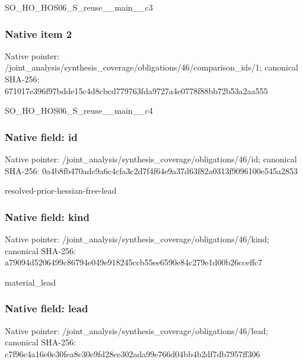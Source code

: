 \documentclass[10pt,a4paper]{article}
\begin{document}
\begingroup\raggedright\sloppy SO\_\allowbreak{}HO\_\allowbreak{}HOS06\_\allowbreak{}S\_\allowbreak{}reuse\_\allowbreak{}\_\allowbreak{}main\_\allowbreak{}\_\allowbreak{}c3\par\endgroup

\subsubsection{Native item 2}
Native pointer: /joint\_\allowbreak{}analysis/synthesis\_\allowbreak{}coverage/obligations/46/comparison\_\allowbreak{}ids/1; canonical SHA-256: 671017e396f97bdde15c4d8cbcd779763fda9727a4e0778f88bb72b53a2aa555

\begingroup\raggedright\sloppy SO\_\allowbreak{}HO\_\allowbreak{}HOS06\_\allowbreak{}S\_\allowbreak{}reuse\_\allowbreak{}\_\allowbreak{}main\_\allowbreak{}\_\allowbreak{}c4\par\endgroup

\subsubsection{Native field: id}
Native pointer: /joint\_\allowbreak{}analysis/synthesis\_\allowbreak{}coverage/obligations/46/id; canonical SHA-256: 0a4b8fb470adc9a6c4cfa3c2d7f4f64e9a37d63f82a0313f9096100e545a2853

\begingroup\raggedright\sloppy resolved-prior-hessian-free-lead\par\endgroup

\subsubsection{Native field: kind}
Native pointer: /joint\_\allowbreak{}analysis/synthesis\_\allowbreak{}coverage/obligations/46/kind; canonical SHA-256: a79094d5206499c86794e049e918245ccb55ee6590e84c279e1d00b26cceffc7

\begingroup\raggedright\sloppy material\_\allowbreak{}lead\par\endgroup

\subsubsection{Native field: lead}
Native pointer: /joint\_\allowbreak{}analysis/synthesis\_\allowbreak{}coverage/obligations/46/lead; canonical SHA-256: c7f96c4a16e0e30fea8c30e9fd28ce302ada99e766d04bb4b2df7db7957ff306
\end{document}

